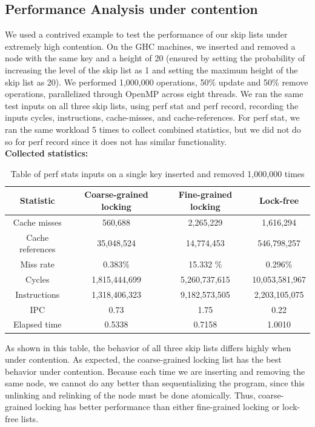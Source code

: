 \documentclass[11pt]{article}
\begin{document}
\subsection{Performance Analysis under contention}
We used a contrived example to test the performance of our skip lists under extremely high contention. On the GHC machines, we inserted and removed a node with the same key and a height of 20 (ensured by setting the probability of increasing the level of the skip list as 1 and setting the maximum height of the skip list as 20). We performed 1,000,000 operations, 50\% update and 50\% remove operations, parallelized through OpenMP across eight threads. We ran the same test inputs on all three skip lists, using perf stat and perf record, recording the inputs cycles, instructions, cache-misses, and cache-references. For perf stat, we ran the same workload 5 times to collect combined statistics, but we did not do so for perf record since it does not has similar functionality. \\

\textbf{Collected statistics:}
\begin{table}[h!]
\begin{center}
\begin{tabular}{|c c c c|}
 \hline
 Statistic & Coarse-grained locking & Fine-grained locking & Lock-free \\ 
 \hline \hline
 \hline
 Cache misses & 560,688 & 2,265,229 & 1,616,294 \\
 \hline
 Cache references & 35,048,524 & 14,774,453 & 546,798,257 \\
 \hline
 Miss rate & 0.383\% & 15.332 \% & 0.296\%\\
 \hline
 Cycles & 1,815,444,699 & 5,260,737,615 & 10,053,581,967 \\
 \hline
 Instructions & 1,318,406,323 & 9,182,573,505 & 2,203,105,075 \\
 \hline
 IPC & 0.73 & 1.75 & 0.22 \\
 \hline
 Elapsed time & 0.5338 & 0.7158 & 1.0010 \\
 \hline
\end{tabular}
\label{table:4}
\caption{Table of perf stats inputs on a single key inserted and removed 1,000,000 times}
\end{center}
\end{table}

As shown in this table, the behavior of all three skip lists differs highly when under contention. As expected, the coarse-grained locking list has the best behavior under contention. Because each time we are inserting and removing the same node, we cannot do any better than sequentializing the program, since this unlinking and relinking of the node must be done atomically. Thus, coarse-grained locking has better performance than either fine-grained locking or lock-free lists. 
\end{document}
